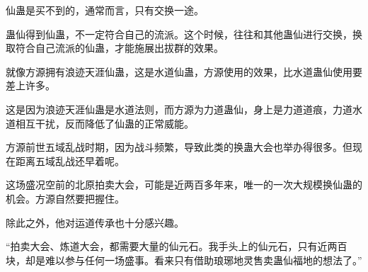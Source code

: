 \begin{this_body}
仙蛊是买不到的，通常而言，只有交换一途。

蛊仙得到仙蛊，不一定符合自己的流派。这个时候，往往和其他蛊仙进行交换，换取符合自己流派的仙蛊，才能施展出拔群的效果。

就像方源拥有浪迹天涯仙蛊，这是水道仙蛊，方源使用的效果，比水道蛊仙使用要差上许多。

这是因为浪迹天涯仙蛊是水道法则，而方源为力道蛊仙，身上是力道道痕，力道水道相互干扰，反而降低了仙蛊的正常威能。

方源前世五域乱战时期，因为战斗频繁，导致此类的换蛊大会也举办得很多。但现在距离五域乱战还早着呢。

这场盛况空前的北原拍卖大会，可能是近两百多年来，唯一的一次大规模换仙蛊的机会。方源自然要把握住。

除此之外，他对运道传承也十分感兴趣。

“拍卖大会、炼道大会，都需要大量的仙元石。我手头上的仙元石，只有近两百块，却是难以参与任何一场盛事。看来只有借助琅琊地灵售卖蛊仙福地的想法了。”

\end{this_body}

